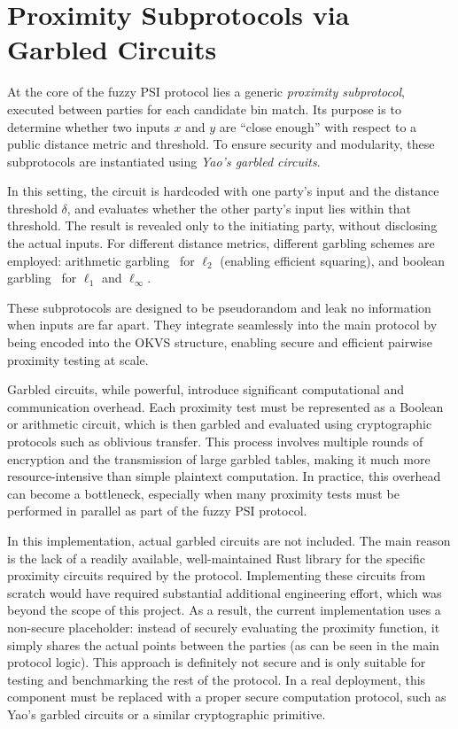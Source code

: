 \section{Proximity Subprotocols via Garbled Circuits}

At the core of the fuzzy PSI protocol lies a generic \emph{proximity subprotocol}, executed between parties for each candidate bin match. Its purpose is to determine whether two inputs $x$ and $y$ are ``close enough'' with respect to a public distance metric and threshold. To ensure security and modularity, these subprotocols are instantiated using \emph{Yao's garbled circuits}.

In this setting, the circuit is hardcoded with one party's input and the distance threshold $\delta$, and evaluates whether the other party's input lies within that threshold. The result is revealed only to the initiating party, without disclosing the actual inputs. For different distance metrics, different garbling schemes are employed: arithmetic garbling~\cite{ballGarblingGadgetsBoolean2016} for $\ell_2$ (enabling efficient squaring), and boolean garbling~\cite{zahurTwoHalvesMake2015} for $\ell_1$ and $\ell_\infty$.

These subprotocols are designed to be pseudorandom and leak no information when inputs are far apart. They integrate seamlessly into the main protocol by being encoded into the OKVS structure, enabling secure and efficient pairwise proximity testing at scale.

Garbled circuits, while powerful, introduce significant computational and communication overhead. Each proximity test must be represented as a Boolean or arithmetic circuit, which is then garbled and evaluated using cryptographic protocols such as oblivious transfer. This process involves multiple rounds of encryption and the transmission of large garbled tables, making it much more resource-intensive than simple plaintext computation. In practice, this overhead can become a bottleneck, especially when many proximity tests must be performed in parallel as part of the fuzzy PSI protocol.

In this implementation, actual garbled circuits are not included. The main reason is the lack of a readily available, well-maintained Rust library for the specific proximity circuits required by the protocol. Implementing these circuits from scratch would have required substantial additional engineering effort, which was beyond the scope of this project. As a result, the current implementation uses a non-secure placeholder: instead of securely evaluating the proximity function, it simply shares the actual points between the parties (as can be seen in the main protocol logic). This approach is definitely not secure and is only suitable for testing and benchmarking the rest of the protocol. In a real deployment, this component must be replaced with a proper secure computation protocol, such as Yao's garbled circuits or a similar cryptographic primitive.

